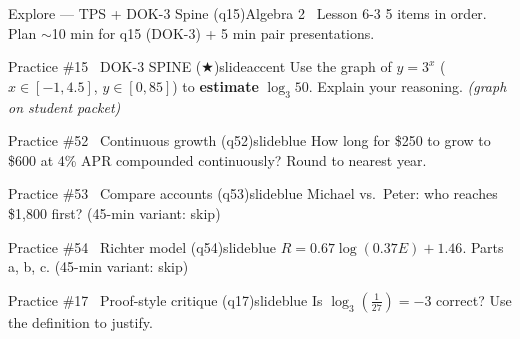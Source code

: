 \documentclass[aspectratio=169, 11pt]{beamer}
\begin{document}
\begin{frame}{Explore --- TPS + DOK-3 Spine (q15)}{Algebra 2 \textperiodcentered\ Lesson 6-3}
\small\textcolor{slidegray}{5 items in order. Plan \(\sim\)10 min for q15 (DOK-3) + 5 min pair presentations.}

\vspace{0.1cm}
\begin{projcard}{Practice \#15 \textperiodcentered\ DOK-3 SPINE (\(\bigstar\))}{slideaccent}
Use the graph of \(y = 3^x\) (\(x \in [-1, 4.5]\), \(y \in [0, 85]\)) to \textbf{estimate} \(\log_3 50\).
Explain your reasoning. \hfill \small\textit{(graph on student packet)}
\end{projcard}
\vspace{-0.12cm}
\begin{projcard}{Practice \#52 \textperiodcentered\ Continuous growth (q52)}{slideblue}
How long for \$250 to grow to \$600 at 4\% APR compounded continuously? Round to nearest year.
\end{projcard}
\vspace{-0.12cm}
\begin{projcard}{Practice \#53 \textperiodcentered\ Compare accounts (q53)}{slideblue}
Michael vs.\ Peter: who reaches \$1{,}800 first? (45-min variant: skip)
\end{projcard}
\vspace{-0.12cm}
\begin{projcard}{Practice \#54 \textperiodcentered\ Richter model (q54)}{slideblue}
\(R = 0.67\log(0.37E)+1.46\). Parts a, b, c. (45-min variant: skip)
\end{projcard}
\vspace{-0.12cm}
\begin{projcard}{Practice \#17 \textperiodcentered\ Proof-style critique (q17)}{slideblue}
Is \(\log_3\!\left(\tfrac{1}{27}\right) = -3\) correct? Use the definition to justify.
\end{projcard}
\end{frame}
\end{document}
